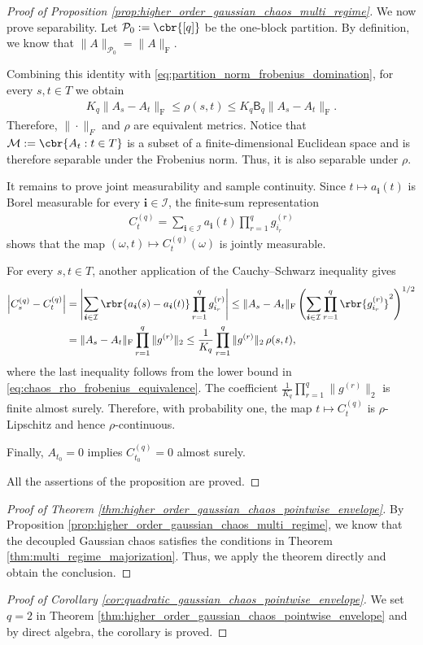 \documentclass[11pt]{article}
\begin{document}
\begin{proof}[Proof of Proposition
\ref{prop:higher_order_gaussian_chaos_multi_regime}]
We now prove separability. Let $\mathcal P_0
:=
\cbr{[q]}$ be the one-block partition. By definition, we know that $\|A\|_{\mathcal P_0}
=
\|A\|_{\mathrm F}$.

Combining this identity with
\eqref{eq:partition_norm_frobenius_domination}, for every $s,t\in T$
we obtain
\begin{align}
K_q\|A_s-A_t\|_{\mathrm F}
\le
\rho(s,t)
\le
K_q\mathsf B_q\|A_s-A_t\|_{\mathrm F}.
\label{eq:chaos_rho_frobenius_equivalence}
\end{align}
Therefore, $\|\cdot\|_F$ and $\rho$ are equivalent metrics. Notice that $\mathcal M
:=
\cbr{A_t:t\in T}$ is a subset of a finite-dimensional Euclidean space and is therefore
separable under the Frobenius norm. Thus, it is also separable under $\rho$.

It remains to prove joint measurability and sample continuity. Since
$t\mapsto a_{\boldsymbol i}(t)$ is Borel measurable for every
$\boldsymbol i\in\mathcal I$, the finite-sum representation
\begin{align*}
C_t^{(q)}
=
\sum_{\boldsymbol i\in\mathcal I}
a_{\boldsymbol i}(t)
\prod_{r=1}^qg^{(r)}_{i_r}
\end{align*}
shows that the map
$(\omega,t)\mapsto C_t^{(q)}(\omega)$ is jointly measurable.

For every $s,t\in T$, another application of the Cauchy--Schwarz
inequality gives
\begin{align*}
\left|C_s^{(q)}-C_t^{(q)}\right|&=
\left|
\sum_{\boldsymbol i\in\mathcal I}
\rbr{a_{\boldsymbol i}(s)-a_{\boldsymbol i}(t)}
\prod_{r=1}^qg^{(r)}_{i_r}
\right|\le
\|A_s-A_t\|_{\mathrm F}
\left(
\sum_{\boldsymbol i\in\mathcal I}
\prod_{r=1}^q\rbr{g^{(r)}_{i_r}}^2
\right)^{1/2}\\
&=
\|A_s-A_t\|_{\mathrm F}
\prod_{r=1}^q\|g^{(r)}\|_2\le
\frac1{K_q}
\prod_{r=1}^q\|g^{(r)}\|_2\,
\rho(s,t),
\end{align*}
where the last inequality follows from the lower bound in
\eqref{eq:chaos_rho_frobenius_equivalence}. The  coefficient
$\frac1{K_q}
\prod_{r=1}^q\|g^{(r)}\|_2$ is finite almost surely. Therefore, with probability one, the map
$t\mapsto C_t^{(q)}$ is $\rho$-Lipschitz and hence
$\rho$-continuous.

Finally, $A_{t_0}=0$ implies $C_{t_0}^{(q)}=0$ almost surely. 

All the assertions of the proposition are proved.
\end{proof}

\begin{proof}[Proof of Theorem \ref{thm:higher_order_gaussian_chaos_pointwise_envelope}]
By Proposition \ref{prop:higher_order_gaussian_chaos_multi_regime}, we know that the decoupled Gaussian chaos satisfies the conditions in Theorem \ref{thm:multi_regime_majorization}. Thus, we apply the theorem directly and obtain the conclusion.
\end{proof}

\begin{proof}[Proof of Corollary \ref{cor:quadratic_gaussian_chaos_pointwise_envelope}]
    We set $q=2$ in Theorem \ref{thm:higher_order_gaussian_chaos_pointwise_envelope} and by direct algebra, the corollary is proved.
\end{proof}






\end{document}
